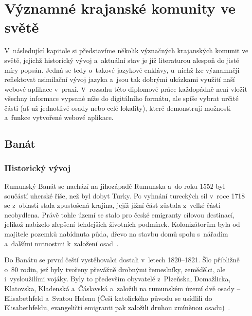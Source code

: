 \hypertarget{vuxfdznamnuxe9-krajanskuxe9-komunity-ve-svux11btux11b}{%
\chapter{Významné krajanské komunity ve světě}\label{vuxfdznamnuxe9-krajanskuxe9-komunity-ve-svux11btux11b}}

V~následující kapitole si představíme několik význačných krajanských komunit ve světě, jejichž historický vývoj a~aktuální stav je již literaturou alespoň do jisté míry popsán. Jedná se tedy o~takové jazykové enklávy, u~nichž lze významněji reflektovat asimilační vývoj jazyka a~jsou tak dobrými ukázkami využití naší webové aplikace v~praxi. V~rozsahu této diplomové práce každopádně není vložit všechny informace vypsané níže do digitálního formátu, ale spíše vybrat určité části (ať už jednotlivé osady nebo celé lokality), které demonstrují možnosti a~funkce vytvořené webové aplikace.

\hypertarget{banuxe1t}{%
\section{Banát}\label{banuxe1t}}

\hypertarget{historickuxfd-vuxfdvoj}{%
\subsection*{Historický vývoj}\label{historickuxfd-vuxfdvoj}}

Rumunský Banát se nachází na jihozápadě Rumunska a~do roku 1552 byl součástí uherské říše, než byl dobyt Turky. Po vyhnání tureckých sil v~roce 1718 se z~oblasti stala zpustošená krajina, jejíž jižní část zůstala z~velké části neobydlena. Právě tohle území se stalo pro české emigranty cílovou destinací, jelikož nabízelo zlepšení tehdejších životních podmínek. Kolonizátorům byla od majitele pozemků nabídnuta půda, dřevo na stavbu domů spolu s~nářadím a~dalšími nutnostmi k~založení osad~\parencite{Secka1995}.

Do Banátu se první čeští vystěhovalci dostali v~letech 1820--1821. Šlo přibližně o~80 rodin, jež byly tvořeny převážně drobnými řemeslníky, zemědělci, ale i~vysloužilími vojáky. Byly to především obyvatelé z~Plzeňska, Domažlicka, Klatovska, Kladenská a~Čáslavská a~založili na rumunském území dvě osady -- Elisabethfeld a~Svatou Helenu (Češi katolického původu se usídlili do Elisabethfeldu, evangeličtí emigranti pak založili druhou zmíněnou osadu)~\parencite{Gecse2013}.

